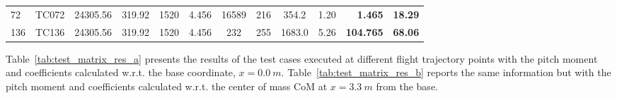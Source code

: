 \documentclass[12pt]{article}
\begin{document}
\begin{table}[H]
{\begin{tabular}{lllcccccccrr}
72 & TC072     & 24305.56                & 319.92                 & 1520                     & 4.456             & 16589                          & 216                           & 354.2                          & 1.20                      & \cellcolor{colPR}\textbf{1.465}                                                  & \cellcolor{colJ}\textbf{18.29} \\
136 & TC136    & 24305.56                & 319.92                 & 1520                     & 4.456             & 232                            & 255                           & 1683.0                         & 5.26                      & \cellcolor{colPR}\textbf{104.765}                                                & \cellcolor{colJ}\textbf{68.06} \\
\bottomrule
\end{tabular}}
\end{table}

Table~\ref{tab:test_matrix_res_a} presents the results of the test cases executed at different flight trajectory points with the pitch moment and coefficients calculated w.r.t. the base coordinate, $x=0.0 ~m$. Table~\ref{tab:test_matrix_res_b} reports the same information but with the pitch moment and coefficients calculated w.r.t. the center of mass CoM at $x=3.3~m$ from the base.
\end{document}
